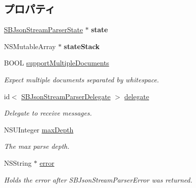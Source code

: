 \subsection*{プロパティ}
\begin{DoxyCompactItemize}
\item 
\hypertarget{interface_s_b_json_stream_parser_aa0bce27e23cb3e352564b5f57876f0e5}{}\hyperlink{interface_s_b_json_stream_parser_state}{S\+B\+Json\+Stream\+Parser\+State} $\ast$ {\bfseries state}\label{interface_s_b_json_stream_parser_aa0bce27e23cb3e352564b5f57876f0e5}

\item 
\hypertarget{interface_s_b_json_stream_parser_a7f7df2e29f60e02d63888e4e8c3ee5b0}{}N\+S\+Mutable\+Array $\ast$ {\bfseries state\+Stack}\label{interface_s_b_json_stream_parser_a7f7df2e29f60e02d63888e4e8c3ee5b0}

\item 
B\+O\+O\+L \hyperlink{interface_s_b_json_stream_parser_afd976c605b67edbb8b7abbebcc5b4093}{support\+Multiple\+Documents}
\begin{DoxyCompactList}\small\item\em Expect multiple documents separated by whitespace. \end{DoxyCompactList}\item 
id$<$ \hyperlink{protocol_s_b_json_stream_parser_delegate-p}{S\+B\+Json\+Stream\+Parser\+Delegate} $>$ \hyperlink{interface_s_b_json_stream_parser_a1a4e90ce1ca9b55e7696db77ef6bf20c}{delegate}
\begin{DoxyCompactList}\small\item\em Delegate to receive messages. \end{DoxyCompactList}\item 
N\+S\+U\+Integer \hyperlink{interface_s_b_json_stream_parser_a1c6f49cb5dd676452994d96498bb5a3f}{max\+Depth}
\begin{DoxyCompactList}\small\item\em The max parse depth. \end{DoxyCompactList}\item 
\hypertarget{interface_s_b_json_stream_parser_a49c6e710bc367cdc627a4152706f1008}{}N\+S\+String $\ast$ \hyperlink{interface_s_b_json_stream_parser_a49c6e710bc367cdc627a4152706f1008}{error}\label{interface_s_b_json_stream_parser_a49c6e710bc367cdc627a4152706f1008}

\begin{DoxyCompactList}\small\item\em Holds the error after S\+B\+Json\+Stream\+Parser\+Error was returned. \end{DoxyCompactList}\end{DoxyCompactItemize}


